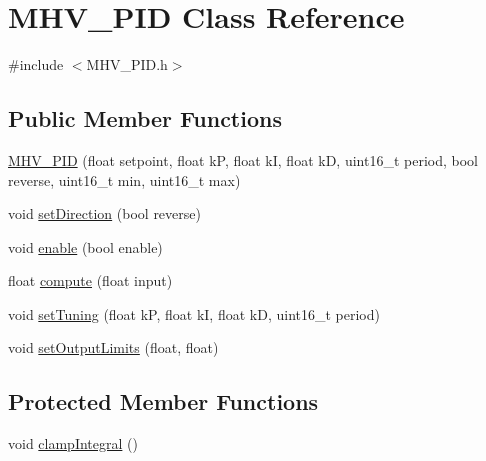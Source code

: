 \hypertarget{class_m_h_v___p_i_d}{\section{M\-H\-V\-\_\-\-P\-I\-D Class Reference}
\label{class_m_h_v___p_i_d}
}


{\ttfamily \#include $<$M\-H\-V\-\_\-\-P\-I\-D.\-h$>$}

\subsection*{Public Member Functions}
\begin{DoxyCompactItemize}
\item 
\hyperlink{class_m_h_v___p_i_d_a0923aad1d58009d5724e68fc4ca1b3a8}{M\-H\-V\-\_\-\-P\-I\-D} (float setpoint, float k\-P, float k\-I, float k\-D, uint16\-\_\-t period, bool reverse, uint16\-\_\-t min, uint16\-\_\-t max)
\item 
void \hyperlink{class_m_h_v___p_i_d_a95369e1c3664baf5cf909225a93c6428}{set\-Direction} (bool reverse)
\item 
void \hyperlink{class_m_h_v___p_i_d_a2887eab7746720d7cd105ca4dfbb753c}{enable} (bool enable)
\item 
float \hyperlink{class_m_h_v___p_i_d_abda9f16bcf4154a86814e069bf1f74b3}{compute} (float input)
\item 
void \hyperlink{class_m_h_v___p_i_d_a1232a57f9e484887c9df927affacc534}{set\-Tuning} (float k\-P, float k\-I, float k\-D, uint16\-\_\-t period)
\item 
void \hyperlink{class_m_h_v___p_i_d_a697f31eedba0445d6e69df90c86ae9e9}{set\-Output\-Limits} (float, float)
\end{DoxyCompactItemize}
\subsection*{Protected Member Functions}
\begin{DoxyCompactItemize}
\item 
void \hyperlink{class_m_h_v___p_i_d_ae07f66a0dbc8a14844d157e97654ecd8}{clamp\-Integral} ()
\end{DoxyCompactItemize}

